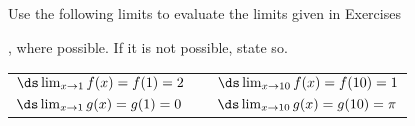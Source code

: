 {\noindent Use the following limits to evaluate the limits given in Exercises}
{, where possible. If it is not possible, state so.

\begin{tabular}{lll}
$\ds \lim_{x\to1}f(x) = f(1) = 2$ & \quad\quad &$\ds \lim_{x\to10} f(x) = f(10) = 1$\\
$\ds \lim_{x\to1}g(x) = g(1) = 0$ &  & $\ds \lim_{x\to10} g(x) = g(10) = \pi$
\end{tabular}}
